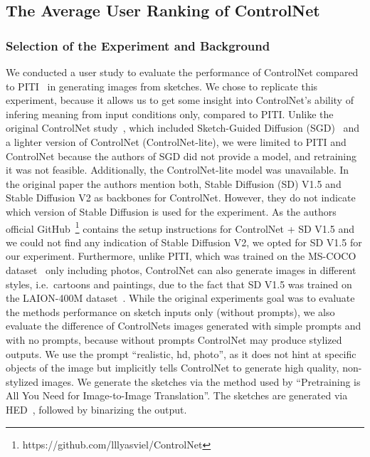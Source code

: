 \subsection{The Average User Ranking of ControlNet}
\subsubsection{Selection of the Experiment and Background}
We conducted a user study to evaluate the performance of ControlNet compared to PITI~\cite{wang2022pretrainingneedimagetoimagetranslation} in generating images from sketches. We chose to replicate this experiment, because it allows us to get some insight into ControlNet's ability of infering meaning from input conditions only, compared to PITI.
Unlike the original ControlNet study~\cite{zhang2023addingconditionalcontroltexttoimage}, which included Sketch-Guided Diffusion (SGD)~\cite{voynov2022sketchguidedtexttoimagediffusionmodels} and a lighter version of ControlNet (ControlNet-lite), we were limited to PITI and ControlNet because the authors of SGD did not provide a model, and retraining it was not feasible. Additionally, the ControlNet-lite model was unavailable. In the original paper the authors mention both, Stable Diffusion (SD) V1.5 and Stable Diffusion V2 as backbones for ControlNet. However, they do not indicate which version of Stable Diffusion is used for the experiment. As the authors official GitHub~\footnote{https://github.com/lllyasviel/ControlNet} contains the setup instructions for ControlNet + SD V1.5 and we could not find any indication of Stable Diffusion V2, we opted for SD V1.5 for our experiment. Furthermore, unlike PITI, which was trained on the MS-COCO dataset~\cite{lin2015microsoftcococommonobjects} only including photos, ControlNet can also generate images in different styles, i.e.\ cartoons and paintings, due to the fact that SD V1.5 was trained on the LAION-400M dataset~\cite{schuhmann2021laion400mopendatasetclipfiltered}. While the original experiments goal was to evaluate the methods performance on sketch inputs only (without prompts), we also evaluate the difference of ControlNets images generated with simple prompts and with no prompts, because without prompts ControlNet may produce stylized outputs. We use the prompt ``realistic, hd, photo'', as it does not hint at specific objects of the image but implicitly tells ControlNet to generate high quality, non-stylized images. We generate the sketches via the method used by ``Pretraining is All You Need for Image-to-Image
Translation''. The sketches are generated via HED~\cite{xie2015holisticallynestededgedetection}, followed by binarizing the output.

